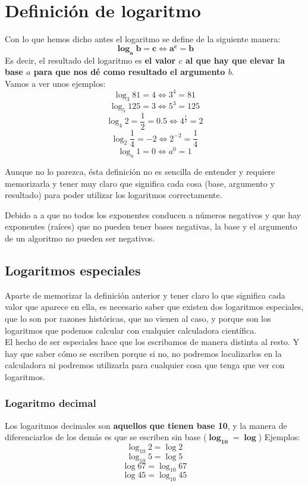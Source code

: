 \documentclass[a4paper,10pt,answers]{exam}
\begin{document}
\section{Definición de logaritmo}
Con lo que hemos dicho antes el logaritmo se define de la siguiente manera:
\Large
\[\boldsymbol {\log_a b = c \Leftrightarrow a^c = b}\]
\normalsize
Es decir, el resultado del logaritmo es \textbf {el valor $c$ al que hay que elevar la base $a$ para que nos dé como resultado el argumento $b$}.\\

Vamos a ver unos ejemplos:
\[\log_3 81 = 4 \Leftrightarrow 3^4 = 81\]
\[\log_5 125 = 3 \Leftrightarrow 5^3 = 125\]
\[\log_4 2 = \frac{1}{2} = 0.5 \Leftrightarrow 4^\frac{1}{2} = 2\]
\[\log_2 \frac{1}{4} = -2 \Leftrightarrow 2^{-2} = \frac{1}{4}\]
\[\log_a 1 = 0 \Leftrightarrow a^0 = 1\]

Aunque no lo parezca, ésta definición no es sencilla de entender y requiere memorizarla y tener muy claro que significa cada cosa (base, argumento y resultado) para poder utilizar los logaritmos correctamente.

Debido a a que no todos los exponentes conducen a números negativos y que hay exponentes (raíces) que no pueden tener bases negativas, la base y el argumento de un algoritmo no pueden ser negativos. 

\subsection{Logaritmos especiales} \label{logaritmos especiales}
Aparte de memorizar la definición anterior y tener claro lo que significa cada valor que aparece en ella, es necesario saber que existen dos logaritmos especiales, que lo son por razones históricas, que no vienen al caso, y porque son los logaritmos que podemos calcular con cualquier calculadora científica.\\
El hecho de ser especiales hace que los escribamos de manera distinta al resto. Y hay que saber cómo se escriben porque si no, no podremos localizarlos en la calculadora ni podremos utilizarla para cualquier cosa que tenga que ver con logaritmos.
\subsubsection{Logaritmo decimal}
Los logaritmos decimales son \textbf{aquellos que tienen base 10}, y la manera de diferenciarlos de los demás es que se escriben sin base ($\boldsymbol {\log_{10} = \log}$) Ejemplos:
\[\log_{10} 2 = \log 2\]
\[\log_{10} 5 =  \log 5\]
\[\log 67 = \log_{10} 67\]
\[\log 45 = \log_{10} 45\]
\end{document}
